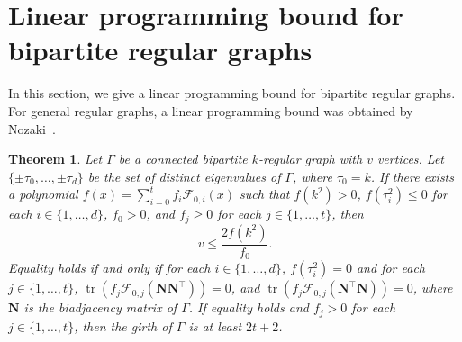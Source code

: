 \documentclass[10pt]{amsart}
\newtheorem{theo}{Theorem}[section]
\DeclareMathOperator{\tr}{tr}
\begin{document}
\section{Linear programming bound for bipartite regular graphs} 
\label{sec:lp}

In this section, we give a linear programming bound for bipartite regular graphs. For general regular graphs, a linear programming bound was obtained by Nozaki~\cite{N}. %
\begin{theo}
\label{thm:lp_bound}
Let $\Gamma$ be a connected bipartite $k$-regular graph with $v$ vertices. 
Let $\{\pm \tau_0, \ldots, \pm \tau_d \}$ be the set of distinct eigenvalues of $\Gamma$, 
where $\tau_0=k$. 
If there exists a polynomial $f(x)=\sum_{i= 0}^t f_i \mathscr{F}_{0,i}(x)$ such that 
$f(k^2)>0$, $f(\tau_i^2) \leq 0$ for each $i\in \{1,\ldots, d \}$, $f_0>0$, and $f_j \geq 0$ for each $j \in \{1,\ldots, t \}$, then 
\begin{equation} 
\label{eq:lp} 
v \leq \frac{2 f(k^2)}{f_0}. 
\end{equation}
Equality holds if and only if for each $i \in \{1,\ldots, d\}$, $f(\tau_i^2)=0$ and for each $j\in \{1,\dots,t\}$, $\tr (f_j\mathscr{F}_{0,j}(\boldsymbol{N}\boldsymbol{N}^{\top}))=0$, 
and $\tr (f_j\mathscr{F}_{0,j}(\boldsymbol{N}^{\top} \boldsymbol{N}))=0$, 
where $\boldsymbol{N}$ is the biadjacency matrix of $\Gamma$.
If equality holds and $f_j>0$ for each $j \in \{1,\ldots, t\}$, then the girth of $\Gamma$ is at least 
$2t+2$. 
\end{theo}
\end{document}
